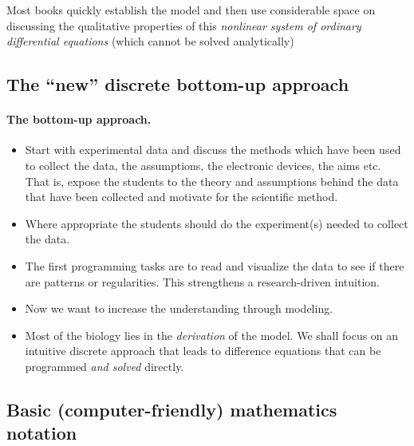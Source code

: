 \documentclass[%
oneside,                 %
final,                   %
10pt]{article}
\begin{document}
\noindent
Most books quickly establish the model and then use considerable space on
discussing the qualitative properties of this \emph{nonlinear system of
ordinary differential equations} (which cannot be solved analytically)




\subsection*{The ``new'' discrete bottom-up approach}


\paragraph{The bottom-up approach.}
\begin{itemize}
 \item Start with experimental data and discuss the methods which have been used to collect the data, the assumptions, the electronic devices, the aims etc. That is, expose the students to the theory and assumptions behind the data that have been collected and motivate for the scientific method.

 \item Where appropriate the students should do the experiment(s) needed to collect the data.

 \item The first programming tasks are to read and visualize the data to see if there are patterns or regularities. This strengthens a research-driven intuition.

 \item Now we want to increase the understanding through modeling.

 \item Most of the biology lies in the \emph{derivation} of the model. We shall
   focus on an intuitive discrete approach that leads to difference
   equations that can be programmed \emph{and solved} directly.
\end{itemize}

\noindent



\subsection*{Basic (computer-friendly) mathematics notation}

\end{document}
